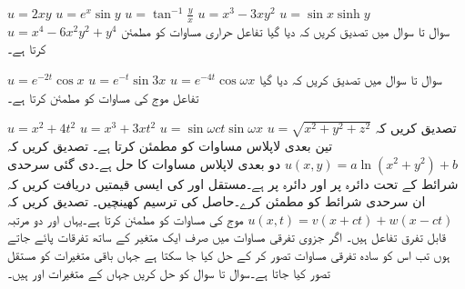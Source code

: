  \quad
$u=2xy$
 \quad
$u=e^x\sin y$
 \quad
$u=\tan^{-1}\frac{y}{x}$
 \quad
$u=x^3-3xy^2$
 \quad
$u=\sin x\sinh y$
 \quad
$u=x^4-6x^2y^2+y^4$
سوال  تا سوال  میں تصدیق کریں کہ دیا گیا تفاعل حراری مساوات  کو مطمئن کرتا ہے۔

 \quad
$u=e^{-2t}\cos x$
\quad
$u=e^{-t}\sin 3x$
\quad
$u=e^{-4t}\cos \omega x$
سوال  تا سوال  میں تصدیق کریں کہ دیا گیا تفاعل موج کی مساوات  کو مطمئن کرتا ہے۔

\quad
$u=x^2+4t^2$
\quad
$u=x^3+3xt^2$
\quad
$u=\sin \omega ct\sin \omega x$
\quad
تصدیق کریں کہ 
$u=\sqrt{x^2+y^2+z^2}$
تین بعدی لاپلاس مساوات  کو مطمئن کرتا ہے۔
\quad
تصدیق کریں کہ
$u(x,y)=a\ln(x^2+y^2)+b$
دو بعدی لاپلاس مساوات  کا حل ہے۔دی گئی سرحدی شرائط کے تحت دائرہ  پر   اور دائرہ  پر  ہے۔مستقل  اور  کی ایسی قیمتیں دریافت کریں کہ  ان سرحدی شرائط کو مطمئن کرے۔حاصل  کی ترسیم کھینچیں۔
\quad
تصدیق کریں کہ
$u(x,t)=v(x+ct)+w(x-ct)$
موج کی مساوات  کو مطمئن کرتا ہے۔یہاں  اور  دو مرتبہ قابل تفرق تفاعل ہیں۔
اگر جزوی تفرقی مساوات میں صرف ایک متغیر کے ساتھ تفرقات پائے جاتے ہوں تب اس کو سادہ تفرقی مساوات تصور کر کے حل کیا جا سکتا ہے جہاں باقی متغیرات کو مستقل تصور کیا جاتا ہے۔سوال  تا سوال  کو حل کریں جہاں  کے متغیرات  اور  ہیں۔


